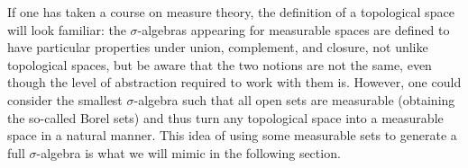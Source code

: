 \begin{rem}
  If one has taken a course on measure theory, the definition of a topological space will look familiar: the $\sigma$-algebras appearing for measurable spaces are defined to have particular properties under union, complement, and closure, not unlike topological spaces, but be aware that the two notions are not the same, even though the level of abstraction required to work with them is. However, one could consider the smallest $\sigma$-algebra such that all open sets are measurable (obtaining the so-called Borel sets) and thus turn any topological space into a measurable space in a natural manner. This idea of using some measurable sets to generate a full $\sigma$-algebra is what we will mimic in the following section.
\end{rem}

